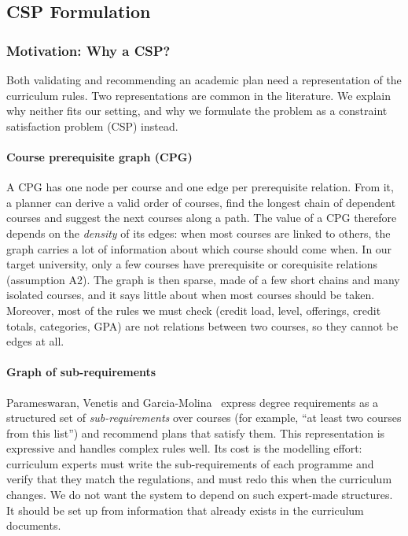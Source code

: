 \subsection{CSP Formulation}\label{sec:formulation}
\subsubsection{Motivation: Why a CSP?}\label{sec:motivation}
Both validating and recommending an academic plan need a representation of the curriculum rules. Two representations are common in the literature. We explain why neither fits our setting, and why we formulate the problem as a constraint satisfaction problem (CSP) instead.

\paragraph{Course prerequisite graph (CPG)}
A CPG has one node per course and one edge per prerequisite relation. From it, a planner can derive a valid order of courses, find the longest chain of dependent courses and suggest the next courses along a path. The value of a CPG therefore depends on the \emph{density} of its edges: when most courses are linked to others, the graph carries a lot of information about which course should come when. In our target university, only a few courses have prerequisite or
corequisite relations (assumption A2). The graph is then sparse, made of a few short chains and many isolated courses, and it says little about when most courses should be taken. Moreover, most of the rules we must check (credit load, level, offerings, credit totals, categories, GPA) are not
relations between two courses, so they cannot be edges at all.

\paragraph{Graph of sub-requirements}
Parameswaran, Venetis and Garcia-Molina~\cite{parameswaran-2011} express degree requirements as a structured set of \emph{sub-requirements} over courses (for example, ``at least two courses from this list'') and recommend plans that satisfy them. This representation is expressive and handles complex rules well. Its cost is the modelling effort: curriculum experts must write the sub-requirements of each programme and verify that they match the regulations, and must redo this when the curriculum changes. We do not want the system to depend on such expert-made structures. It should be set up from information that already exists in the curriculum documents.

